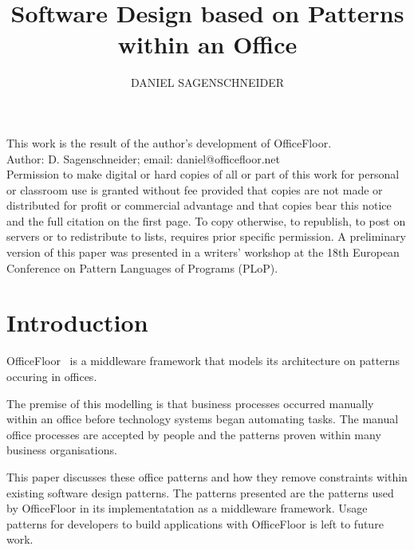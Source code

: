 \documentclass[prodmode]{style/acmlarge}
\title{Software Design based on Patterns within an Office}
\author{DANIEL SAGENSCHNEIDER \affil{OfficeFloor, daniel@officefloor.net}}
\begin{document}
\graphicspath{{./pdf/}}

\lstset{language=Java}

\captionsetup[lstlisting]{font=footnotesize}


\begin{bottomstuff}
This work is the result of the author's development of OfficeFloor.\\
Author: D. Sagenschneider; email: daniel@officefloor.net\\

Permission to make digital or hard copies of all or part of this work for
personal or classroom use is granted without fee provided that copies are not
made or distributed for profit or commercial advantage and that copies bear this
notice and the full citation on the first page. To copy otherwise, to republish,
to post on servers or to redistribute to lists, requires prior specific
permission. A preliminary version of this paper was presented in a writers'
workshop at the 18th European Conference on Pattern Languages of Programs
(PLoP).
\end{bottomstuff}

\maketitle




\section{Introduction}

OfficeFloor~\cite{officefloor} is a middleware framework that models its
architecture on patterns occuring in offices.

The premise of this modelling is that business processes occurred manually
within an office before technology systems began automating tasks.  The manual
office processes are accepted by people and the patterns proven within many
business organisations.

This paper discusses these office patterns and how they remove constraints
within existing software design patterns.  The patterns presented are the
patterns used by OfficeFloor in its implementatation as a middleware framework.
Usage patterns for developers to build applications with OfficeFloor is left to
future work.
\end{document}
